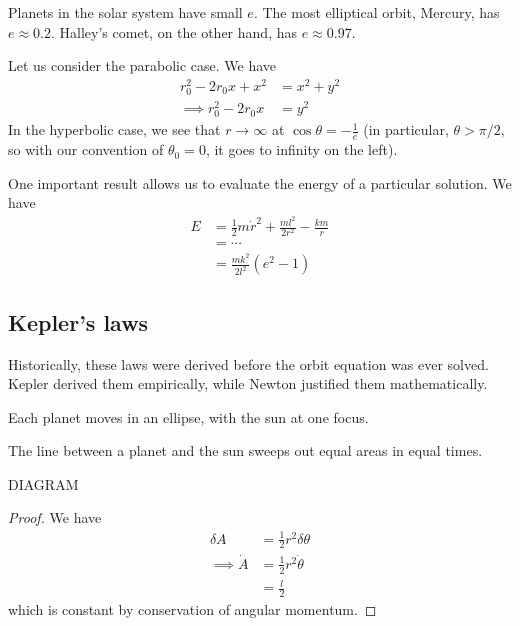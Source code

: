 \documentclass{../template/note}
\begin{document}
    Planets in the solar system have small \(e\). The most elliptical orbit, Mercury, has \(e \approx 0.2\). Halley's comet, on the other hand, has \(e \approx 0.97\).

    Let us consider the parabolic case. We have
    \begin{align*}
        r_0^2 - 2r_0x + x^2 &= x^2 + y^2 \\
        \implies r_0^2 - 2r_0x &= y^2
    \end{align*}
    In the hyperbolic case, we see that \(r \to \infty\) at \(\cos \theta = -\frac 1 e\) (in particular, \(\theta > \pi/2\), so with our convention of \(\theta_0 = 0\), it goes to infinity on the left).

    One important result allows us to evaluate the energy of a particular solution. We have
    \begin{align*}
        E &= \frac 1 2 m \dot r^2 + \frac{ml^2}{2r^2} - \frac{km}r \\
        &= \cdots \\
        &= \frac{mk^2}{2l^2}(e^2-1)
    \end{align*}
    
    \subsection{Kepler's laws}
    
    Historically, these laws were derived before the orbit equation was ever solved. Kepler derived them empirically, while Newton justified them mathematically.

    \begin{proposition}
        Each planet moves in an ellipse, with the sun at one focus.
    \end{proposition}

    \begin{proposition}
        The line between a planet and the sun sweeps out equal areas in equal times.

        DIAGRAM
    \end{proposition}
    
    \begin{proof}
        We have
        \begin{align*}
            \delta A &= \frac 1 2 r^2 \delta \theta \\ 
            \implies \dot A &= \frac 1 2 r^2 \dot \theta \\
            &= \frac l 2
        \end{align*}
        which is constant by conservation of angular momentum.
    \end{proof}
    
\end{document}
